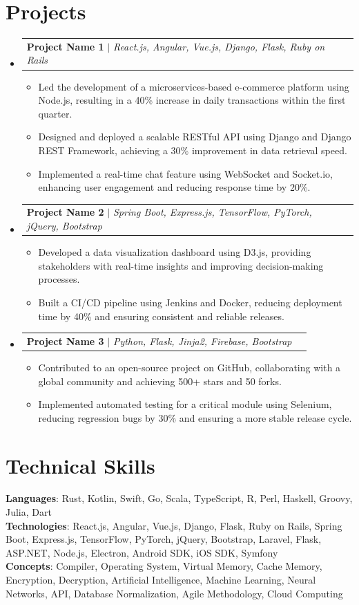 \documentclass[letterpaper,11pt]{article}
\makeatletter
\newcommand{\resumeItem}[1]{
  \item\small{
    {#1 \vspace{-2pt}}
  }
}
\newcommand{\resumeProjectHeading}[2]{
    \item
    \begin{tabular*}{0.97\textwidth}{l@{\extracolsep{\fill}}r}
      \small#1 & #2 \\
    \end{tabular*}\vspace{-7pt}
}
\newcommand{\resumeSubHeadingListStart}{\begin{itemize}[leftmargin=0.15in, label={}]}
\newcommand{\resumeSubHeadingListEnd}{\end{itemize}}
\newcommand{\resumeItemListStart}{\begin{itemize}}
\newcommand{\resumeItemListEnd}{\end{itemize}\vspace{-5pt}}
\makeatother
\begin{document}
\section{Projects}
  \resumeSubHeadingListStart
    \resumeProjectHeading
      {\textbf{Project Name 1} $|$ \emph{React.js, Angular, Vue.js, Django, Flask, Ruby on Rails}}{}
      \resumeItemListStart
        \resumeItem{Led the development of a microservices-based e-commerce platform using Node.js, resulting in a 40\% increase in daily transactions within the first quarter.}
        \resumeItem{Designed and deployed a scalable RESTful API using Django and Django REST Framework, achieving a 30\% improvement in data retrieval speed.}
        \resumeItem{Implemented a real-time chat feature using WebSocket and Socket.io, enhancing user engagement and reducing response time by 20\%.}
      \resumeItemListEnd

    \resumeProjectHeading
      {\textbf{Project Name 2} $|$ \emph{Spring Boot, Express.js, TensorFlow, PyTorch, jQuery, Bootstrap}}{}
      \resumeItemListStart
        \resumeItem{Developed a data visualization dashboard using D3.js, providing stakeholders with real-time insights and improving decision-making processes.}
        \resumeItem{Built a CI/CD pipeline using Jenkins and Docker, reducing deployment time by 40\% and ensuring consistent and reliable releases.}
      \resumeItemListEnd

    \resumeProjectHeading
      {\textbf{Project Name 3} $|$ \emph{Python, Flask, Jinja2, Firebase, Bootstrap}}{}
      \resumeItemListStart
        \resumeItem{Contributed to an open-source project on GitHub, collaborating with a global community and achieving 500+ stars and 50 forks.}
        \resumeItem{Implemented automated testing for a critical module using Selenium, reducing regression bugs by 30\% and ensuring a more stable release cycle.}
      \resumeItemListEnd
  \resumeSubHeadingListEnd

\section{Technical Skills}
 \begin{itemize}[leftmargin=0.15in, label={}]
    \small{\item{
     \textbf{Languages}{: Rust, Kotlin, Swift, Go, Scala, TypeScript, R, Perl, Haskell, Groovy, Julia, Dart} \\
     \textbf{Technologies}{: React.js, Angular, Vue.js, Django, Flask, Ruby on Rails, Spring Boot, Express.js, TensorFlow, PyTorch, jQuery, Bootstrap, Laravel, Flask, ASP.NET, Node.js, Electron, Android SDK, iOS SDK, Symfony} \\
     \textbf{Concepts}{: Compiler, Operating System, Virtual Memory, Cache Memory, Encryption, Decryption, Artificial Intelligence, Machine Learning, Neural Networks, API, Database Normalization, Agile Methodology, Cloud Computing}
    }}
 \end{itemize}

\end{document}
